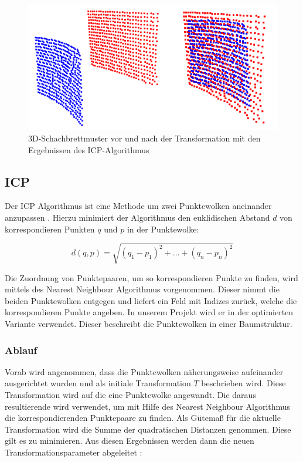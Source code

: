\begin{figure}[H]
	\includegraphics[scale=1.0]{bilder/icpresult}
	\caption[3D-Schachbrettmuster vor und nach der Transformation mit den Ergebnissen des ICP-Algorithmus]{3D-Schachbrettmuster vor und nach der Transformation mit den Ergebnissen des ICP-Algorithmus}
	\label{fig:icpresult}
\end{figure}

\subsection{ICP}
\label{sec:icp}

Der ICP Algorithmus ist eine Methode um zwei Punktewolken aneinander anzupassen \cite{icp1} \cite{icp2}.
Hierzu minimiert der Algorithmus den euklidischen Abstand $d$ von korrespondieren Punkten $q$ und $p$ in der Punktewolke:

\begin{equation}
d(q,p) = \sqrt{(q_{1}-p_{1})^{2} + ... + 
	(q_{n} -p_{n})^{2}}
\end{equation}

\noindent Die Zuordnung von Punktepaaren, um so korrespondieren Punkte zu finden, wird mittels des Nearest Neighbour Algorithmus vorgenommen. Dieser nimmt die beiden Punktewolken entgegen und liefert ein Feld mit Indizes zurück, welche die korrespondieren Punkte angeben. In unserem Projekt wird er in der optimierten Variante verwendet. Dieser beschreibt die Punktewolken in einer Baumstruktur.

\subsubsection{Ablauf}
\label{ss:ablauf}

Vorab wird angenommen, dass die Punktewolken näherungsweise aufeinander ausgerichtet wurden und als
initiale Transformation $T$ beschrieben wird. Diese Transformation wird auf die eine Punktewolke angewandt. Die daraus resultierende wird verwendet, um mit Hilfe des Nearest Neighbour Algorithmus die korrespondierenden Punktepaare zu finden. 
Als Gütemaß für die aktuelle Transformation wird die Summe der quadratischen Distanzen genommen. Diese gilt es zu minimieren. Aus diesen Ergebnissen werden dann die neuen Transformationsparameter abgeleitet \cite{icp3}:

